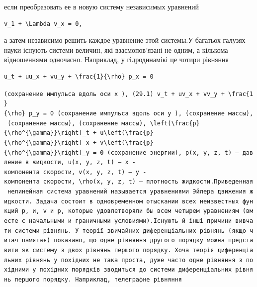 \documentclass[
  ukrainian,
]{article}
\begin{document}
если преобразовать ее в новую систему независимых уравнений

\begin{verbatim}
v_1 + \Lambda v_x = 0,
\end{verbatim}

а затем независимо решить каждое уравнение этой системы.У багатьох
галузях науки існують системи величин, які взаємопов'язані не одним, а
кількома відношеннями одночасно. Наприклад, у гідродинамікі це чотири
рівняння

\begin{verbatim}
u_t + uu_x + vu_y + \frac{1}{\rho} p_x = 0
\end{verbatim}

\texttt{(сохранение\ импульса\ вдоль\ оси\ \textquotesingle{}x\textquotesingle{}\ ),\ (29.1)\ \textquotesingle{}v\_t\ +\ uv\_x\ +\ vv\_y\ +\ \textbackslash{}frac\{1\}\{\textbackslash{}rho\}\ p\_y\ =\ 0\textquotesingle{}\ (сохранение\ импульса\ вдоль\ оси\ \textquotesingle{}y\textquotesingle{}\ ),\ (сохранение\ массы),\ (сохранение\ массы),\ (сохранение\ массы),\ \textquotesingle{}\textbackslash{}left(\textbackslash{}frac\{p\}\{\textbackslash{}rho\^{}\{\textbackslash{}gamma\}\}\textbackslash{}right)\_t\ +\ u\textbackslash{}left(\textbackslash{}frac\{p\}\{\textbackslash{}rho\^{}\{\textbackslash{}gamma\}\}\textbackslash{}right)\_x\ +\ v\textbackslash{}left(\textbackslash{}frac\{p\}\{\textbackslash{}rho\^{}\{\textbackslash{}gamma\}\}\textbackslash{}right)\_y\ =\ 0\textquotesingle{}\ (сохранение\ энергии),\ \textquotesingle{}p(x,\ y,\ z,\ t)\textquotesingle{}\ —\ давление\ в\ жидкости,\ \textquotesingle{}u(x,\ y,\ z,\ t)\textquotesingle{}\ —\ \textquotesingle{}x\textquotesingle{}\ -компонента\ скорости,\ \textquotesingle{}v(x,\ y,\ z,\ t)\textquotesingle{}\ —\ \textquotesingle{}y\textquotesingle{}\ -компонента\ скорости,\ \textquotesingle{}\textbackslash{}rho(x,\ y,\ z,\ t)\textquotesingle{}\ —\ плотность\ жидкости.Приведенная\ нелинейная\ система\ уравнений\ называется\ уравнениями\ Эйлера\ движения\ жидкости.\ Задача\ состоит\ в\ одновременном\ отыскании\ всех\ неизвестных\ функций\ р,\ и,\ v\ и\ р,\ которые\ удовлетворяли\ бы\ всем\ четырем\ уравнениям\ (вместе\ с\ начальными\ и\ граничными\ условиями).Існують\ й\ інші\ причини\ вивчати\ системи\ рівнянь.\ У\ теорії\ звичайних\ диференціальних\ рівнянь\ (якщо\ читач\ пам\textquotesingle{}ятає)\ показано,\ що\ одне\ рівняння\ другого\ порядку\ можна\ представити\ як\ систему\ з\ двох\ рівнянь\ першого\ порядку.\ Хоча\ теорія\ диференціальних\ рівнянь\ у\ похідних\ не\ така\ проста,\ дуже\ часто\ одне\ рівняння\ з\ похідними\ у\ похідних\ порядків\ зводиться\ до\ системи\ диференціальних\ рівнянь\ першого\ порядку.\ Наприклад,\ телеграфне\ рівняння}
\end{document}
